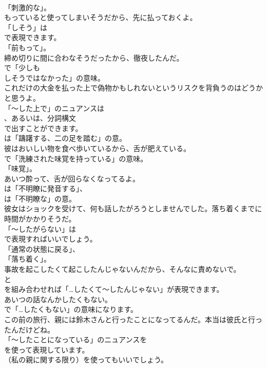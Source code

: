 \documentclass[8pt]{extreport}
\begin{document}
\begin{CJK}{UTF8}{min}
\\	「刺激的な」。	
\\	もっていると使ってしまいそうだから、先に払っておくよ。 
\\	「しそう」は
\\	で表現できます。
\\	「前もって」。	
\\	締め切りに間に合わなそうだったから、徹夜したんだ。 
\\	で「少しも 
\\	しそうではなかった」の意味。	
\\	これだけの大金を払った上で偽物かもしれないというリスクを背負うのはどうかと思うよ。 
\\	「～した上で」のニュアンスは 
\\	、あるいは、分詞構文
\\	で出すことができます。
\\	は「躊躇する、二の足を踏む」の意。	
\\	彼はおいしい物を食べ歩いているから、舌が肥えている。 
\\	で「洗練された味覚を持っている」の意味。
\\	「味覚」。	
\\	あいつ酔って、舌が回らなくなってるよ。 
\\	は「不明瞭に発音する」、
\\	は「不明瞭な」の意。	
\\	彼女はショックを受けて、何も話したがろうとしませんでした。落ち着くまでに時間がかかりそうだ。 
\\	「～したがらない」は
\\	で表現すればいいでしょう。
\\	「通常の状態に戻る」、
\\	「落ち着く」。	
\\	事故を起こしたくて起こしたんじゃないんだから、そんなに責めないで。 
\\	と 
\\	を組み合わせれば「…したくて～したんじゃない」が表現できます。	
\\	あいつの話なんかしたくもない。 
\\	で「…したくもない」の意味になります。	
\\	この前の旅行、親には鈴木さんと行ったことになってるんだ。本当は彼氏と行ったんだけどね。 
\\	「～したことになっている」のニュアンスを 
\\	を使って表現しています。
\\	（私の親に関する限り）を使ってもいいでしょう。	

\end{CJK}
\end{document}
